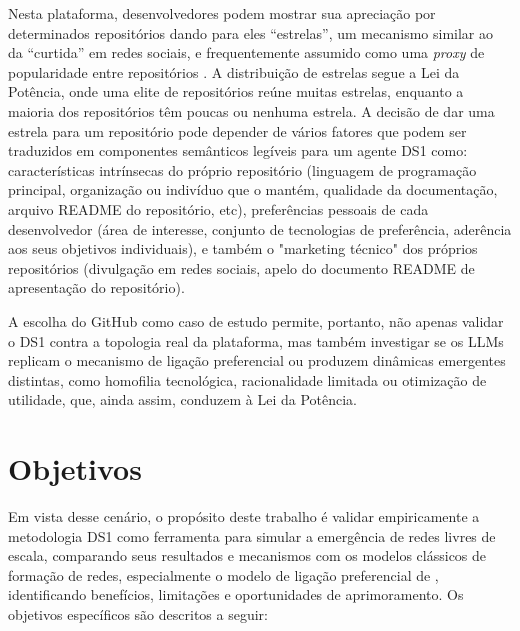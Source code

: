 \documentclass[12pt,oneside,a4paper,brazil,sumario=tradicional]{abntex2}
\begin{document}
Nesta plataforma, desenvolvedores podem mostrar sua apreciação por determinados repositórios dando para eles “estrelas”, um mecanismo similar ao da “curtida” em redes sociais, e frequentemente assumido como uma \textit{proxy }de popularidade entre repositórios \parencite{borges2018, borges2016, gu2026}. A distribuição de estrelas segue a Lei da Potência, onde uma elite de repositórios reúne muitas estrelas, enquanto a maioria dos repositórios têm poucas ou nenhuma estrela. A decisão de dar uma estrela para um repositório pode depender de vários fatores que podem ser traduzidos em componentes semânticos legíveis para um agente DS1 como: características intrínsecas do próprio repositório (linguagem de programação principal, organização ou indivíduo que o mantém, qualidade da documentação, arquivo README do repositório, etc), preferências pessoais de cada desenvolvedor (área de interesse, conjunto de tecnologias de preferência, aderência aos seus objetivos individuais), e também o "marketing técnico" dos próprios repositórios (divulgação em redes sociais, apelo do documento README de apresentação do repositório).

A escolha do GitHub como caso de estudo permite, portanto, não apenas validar o DS1 contra a topologia real da plataforma, mas também investigar se os LLMs replicam o mecanismo de ligação preferencial ou produzem dinâmicas emergentes distintas, como homofilia tecnológica, racionalidade limitada ou otimização de utilidade, que, ainda assim, conduzem à Lei da Potência.

\section*{Objetivos}
Em vista desse cenário, o propósito deste trabalho é validar empiricamente a metodologia DS1 como ferramenta para simular a emergência de redes livres de escala, comparando seus resultados e mecanismos com os modelos clássicos de formação de redes, especialmente o modelo de ligação preferencial de \textcite{barabasi1999}, identificando benefícios, limitações e oportunidades de aprimoramento. Os objetivos específicos são descritos a seguir:
\end{document}
